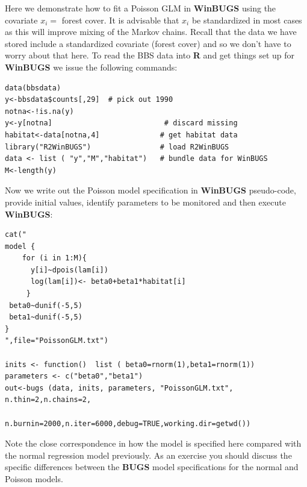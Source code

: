 Here we demonstrate how to fit a Poisson GLM in {\bf WinBUGS} using the
covariate $x_{i} =$ forest cover. It is advisable that $x_i$ be
standardized in most cases as this will improve mixing of the Markov
chains. Recall that the data we have stored include a standardized
covariate (forest cover) and so we don't have to worry about that
here.  To read the BBS data into {\bf R} and get things set up for
{\bf WinBUGS}
we issue the following commands:
{\small
\begin{verbatim}
data(bbsdata)
y<-bbsdata$counts[,29]  # pick out 1990
notna<-!is.na(y)
y<-y[notna]                          # discard missing
habitat<-data[notna,4]              # get habitat data
library("R2WinBUGS")                # load R2WinBUGS
data <- list ( "y","M","habitat")   # bundle data for WinBUGS
M<-length(y)
\end{verbatim}
}
Now we write out the Poisson model specification in {\bf WinBUGS}
pseudo-code, provide initial values, identify parameters to be
monitored and then execute {\bf WinBUGS}:
{\small
\begin{verbatim}
cat("
model {
    for (i in 1:M){
      y[i]~dpois(lam[i])
      log(lam[i])<- beta0+beta1*habitat[i]
     }
 beta0~dunif(-5,5)
 beta1~dunif(-5,5)
}
",file="PoissonGLM.txt")

inits <- function()  list ( beta0=rnorm(1),beta1=rnorm(1))
parameters <- c("beta0","beta1")
out<-bugs (data, inits, parameters, "PoissonGLM.txt", n.thin=2,n.chains=2,
                n.burnin=2000,n.iter=6000,debug=TRUE,working.dir=getwd())
\end{verbatim}
}
Note the close correspondence in how the model is
specified here compared with the normal regression model
previously. As an exercise you should discuss the specific differences
between the {\bf BUGS} model specifications for the normal and Poisson
models. 


